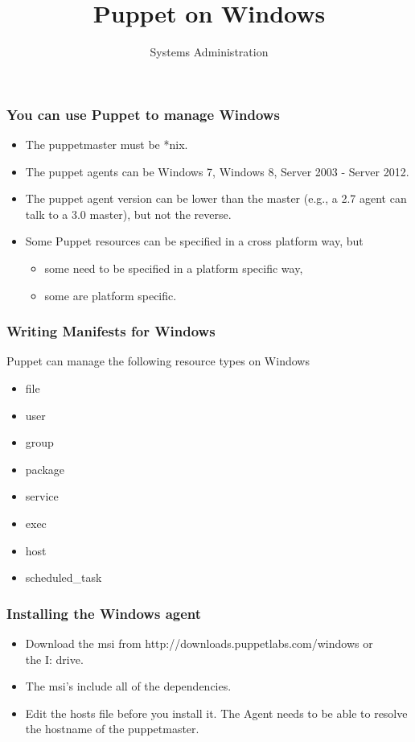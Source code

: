 \documentclass[10pt]{beamer}
\title{Puppet on Windows}
\author[IN719]{Systems Administration}
\institute[Otago Polytechnic]{
  Otago Polytechnic \\
  Dunedin, New Zealand \\
}
\date{}
\begin{document}
\begin{frame}[plain]
  \titlepage
\end{frame}

\begin{frame}
  \frametitle{You can use Puppet to manage Windows}
  
\begin{itemize}
\item The puppetmaster must be *nix.
\item  The puppet agents can be Windows 7, Windows 8,  Server 2003 - Server 2012.
\item  The puppet agent version can be lower than the master (e.g., a 2.7 agent can talk to a 3.0 master), but not the reverse.
\item Some Puppet resources can be specified in a cross platform way, but
         \begin{itemize}
\item  some need to be specified in a platform specific way,
\item  some are platform specific.
\end{itemize}
\end{itemize}
\end{frame}


\begin{frame}
 \frametitle{Writing Manifests for Windows}
  
Puppet can manage the following resource types on Windows
\begin{itemize}
\item file
\item user
\item group
\item package
\item service
\item exec
\item host
\item scheduled\_task
\end{itemize}


\end{frame}

\begin{frame}
  \frametitle{Installing the Windows agent}
  
\begin{itemize}
\item Download the msi from http://downloads.puppetlabs.com/windows or \\ the I: drive.
\item The msi's include all of the dependencies.
\item Edit the hosts file before you install it.  The Agent needs to be able to resolve the hostname of the puppetmaster.
\end{itemize}


\end{frame}
\end{document}

